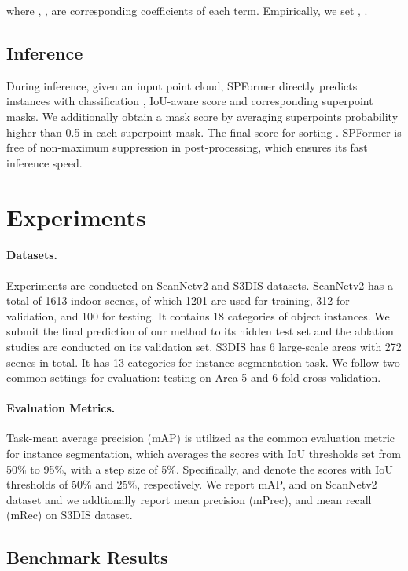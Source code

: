 \documentclass[letterpaper]{article} \usepackage{aaai23}  \usepackage{times}  \usepackage{helvet}  \usepackage{courier}  \usepackage[hyphens]{url}  \usepackage{graphicx} \urlstyle{rm} \def\UrlFont{\rm}  \usepackage{natbib}  \usepackage{caption} \frenchspacing  \setlength{\pdfpagewidth}{8.5in}  \setlength{\pdfpageheight}{11in}  \usepackage{algorithm}
\begin{document}
where , ,  are corresponding coefficients of each
term. Empirically, we set , .

\subsection{Inference}
\label{sec:inference}
During inference, given an input point cloud, SPFormer directly predicts  instances with classification , IoU-aware score  and corresponding superpoint masks. We additionally obtain a mask score  by averaging superpoints probability higher than 0.5 in each superpoint mask. The final score for sorting . SPFormer is free of non-maximum suppression in post-processing, which ensures its fast inference speed.

\section{Experiments}
\label{sec:exps}

\paragraph{Datasets.} Experiments are conducted on ScanNetv2 \cite{scannet} and S3DIS \cite{s3dis} datasets. ScanNetv2 has a total of 1613 indoor scenes, of which 1201 are used for training, 312 for validation, and 100 for testing. It contains 18 categories of object instances. We submit the final prediction of our method to its hidden test set and the ablation studies are conducted on its validation set. S3DIS has 6 large-scale areas with 272 scenes in total. It has 13 categories for instance segmentation task. We follow two common settings for evaluation: testing on Area 5 and 6-fold cross-validation.




\paragraph{Evaluation Metrics.} Task-mean average precision (mAP) is utilized as the common evaluation metric for instance segmentation, which averages the scores with IoU thresholds set from 50\% to 95\%, with a step size of 5\%. Specifically,  and  denote the scores with IoU thresholds of 50\% and 25\%, respectively. We report mAP,  and  on ScanNetv2 dataset and we addtionally report mean precision (mPrec), and mean recall (mRec) on S3DIS dataset.

\subsection{Benchmark Results}
\end{document}
